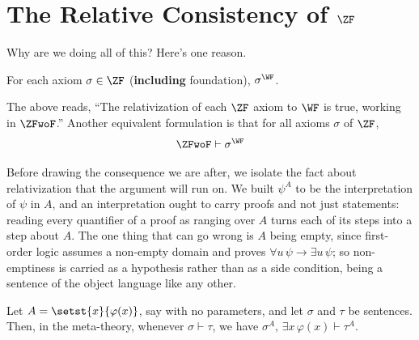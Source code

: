 \section{The Relative Consistency of $\ZF$}

Why are we doing all of this? Here's one reason.

\begin{boxtheorem} \label{Ch3:Thm:ZF_Relativizes_To_WF}
    For each axiom $\sigma \in \ZF$ (\textbf{including} foundation), $\sigma^{\WF}$.
\end{boxtheorem}
The above reads, ``The relativization of each $\ZF$ axiom to $\WF$ is true, working in $\ZFwoF$.'' Another equivalent formulation is that for all axioms $\sigma$ of $\ZF$,
\begin{align}
    \ZFwoF \vdash \sigma^{\WF}
\end{align}

Before drawing the consequence we are after, we isolate the fact about relativization that the argument will run on. We built $\psi^A$ to be the interpretation of $\psi$ in $A$, and an interpretation ought to carry proofs and not just statements: reading every quantifier of a proof as ranging over $A$ turns each of its steps into a step about $A$. The one thing that can go wrong is $A$ being empty, since first-order logic assumes a non-empty domain and proves $\forall u \, \psi \to \exists u \, \psi$; so non-emptiness is carried as a hypothesis rather than as a side condition, being a sentence of the object language like any other.

\begin{boxlemma}[Scheme] \label{Ch3:Lemma:Relativization_Preserves_Proofs}
    Let $A = \setst{x}{\varphi(x)}$, say with no parameters, and let $\sigma$ and $\tau$ be sentences. Then, in the meta-theory, whenever $\sigma \vdash \tau$, we have $\sigma^A, \, \exists x \, \varphi(x) \vdash \tau^A$.
\end{boxlemma}

